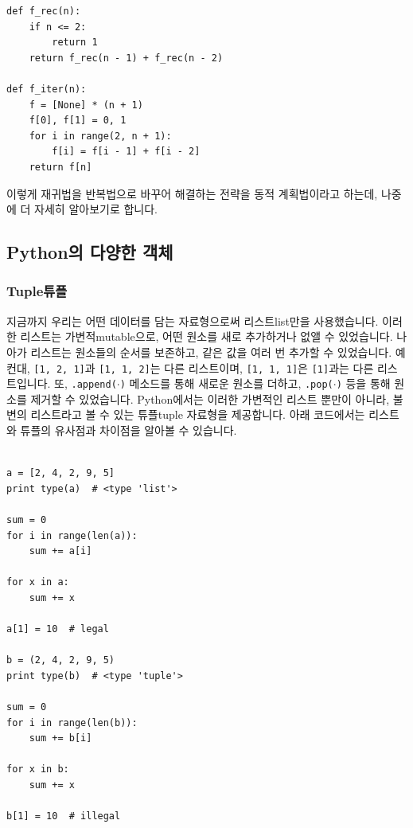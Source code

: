 \documentclass[../main.tex]{subfiles}
\begin{document}
\begin{verbatim}
def f_rec(n):
    if n <= 2:
        return 1
    return f_rec(n - 1) + f_rec(n - 2)

def f_iter(n):
    f = [None] * (n + 1)
    f[0], f[1] = 0, 1
    for i in range(2, n + 1):
        f[i] = f[i - 1] + f[i - 2]
    return f[n]
\end{verbatim}

이렇게 재귀법을 반복법으로 바꾸어 해결하는 전략을 동적 계획법이라고 하는데, 나중에 더 자세히 알아보기로 합니다.

\subsection{Python의 다양한 객체}
\subsubsection{Tuple튜플}
지금까지 우리는 어떤 데이터를 담는 자료형으로써 리스트list만을 사용했습니다.
이러한 리스트는 가변적mutable으로, 어떤 원소를 새로 추가하거나 없앨 수 있었습니다.
나아가 리스트는 원소들의 순서를 보존하고, 같은 값을 여러 번 추가할 수 있었습니다.
예컨대, \texttt{[1, 2, 1]}과 \texttt{[1, 1, 2]}는 다른 리스트이며, \texttt{[1, 1, 1]}은 \texttt{[1]}과는 다른 리스트입니다.
또, \texttt{.append($\cdot$)} 메소드를 통해 새로운 원소를 더하고, \texttt{.pop($\cdot$)} 등을 통해 원소를 제거할 수 있었습니다.
Python에서는 이러한 가변적인 리스트 뿐만이 아니라, 불변의 리스트라고 볼 수 있는 튜플tuple 자료형을 제공합니다.
아래 코드에서는 리스트와 튜플의 유사점과 차이점을 알아볼 수 있습니다.
\begin{verbatim}

a = [2, 4, 2, 9, 5]
print type(a)  # <type 'list'>

sum = 0
for i in range(len(a)):
    sum += a[i]

for x in a:
    sum += x

a[1] = 10  # legal

b = (2, 4, 2, 9, 5)
print type(b)  # <type 'tuple'>

sum = 0
for i in range(len(b)):
    sum += b[i]

for x in b:
    sum += x

b[1] = 10  # illegal
\end{verbatim}
\end{document}
